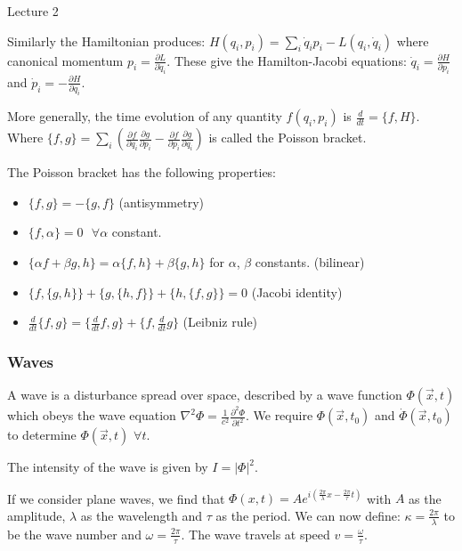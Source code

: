 \begin{center}

Lecture 2

\end{center}

Similarly the Hamiltonian produces: $H(q_i, p_i) = \sum_i \dot{q}_i p _i - L(q_i, \dot{q}_i)$ where canonical momentum $p_i = \frac{\partial L}{\partial \dot{q}_i}$. These give the Hamilton-Jacobi equations: $\dot{q}_i = \frac{\partial H}{\partial p_i}$ and $\dot{p}_i = - \frac{\partial H}{\partial q_i}$.

More generally, the time evolution of any quantity $f(q_i, p_i)$ is $\frac{d}{dt} = \{ f, H \}$. Where $\{f, g\} = \sum_i \left( \frac{\partial f}{\partial q_i} \frac{\partial g}{\partial p_i} - \frac{\partial f}{\partial p_i} \frac{\partial g}{\partial q_i}\right)$ is called the Poisson bracket.

The Poisson bracket has the following properties:

\begin{itemize}
\item $\{ f, g\} = - \{g,f\}$ (antisymmetry)
\item $\{f, \alpha \} = 0 \, \, \, \, \forall \alpha$ constant.
\item $\{ \alpha f + \beta g, h\} = \alpha \{f, h\} + \beta \{g, h\}$ for $\alpha$, $\beta$ constants. (bilinear)
\item $\{f, \{g,h\}\} + \{g, \{h, f\}\} + \{h, \{f,g\}\} = 0$ (Jacobi identity)
\item $\frac{d}{dt} \{f, g\} = \{\frac{d}{dt} f, g\} + \{f, \frac{d}{dt} g\}$ (Leibniz rule)
\end{itemize}

\subsubsection{Waves}

A wave is a disturbance spread over space, described by a wave function $\Phi (\vec{x}, t)$ which obeys the wave equation $\nabla^2 \Phi = \frac{1}{c^2} \frac{\partial^2 \Phi}{\partial t^2}$. We require $\Phi (\vec{x}, t_0)$ and $\dot{\Phi} (\vec{x}, t_0)$ to determine $\Phi (\vec{x}, t)$ $\forall t$.

The intensity of the wave is given by $I = |\Phi|^2$.

If we consider plane waves, we find that $\Phi (x, t) = A e^{i \left(\frac{2\pi}{\lambda} x - \frac{2\pi}{\tau} t\right)}$ with $A$ as the amplitude, $\lambda$ as the wavelength and $\tau$ as the period. We can now define: $\kappa = \frac{2\pi}{\lambda}$ to be the wave number and $\omega = \frac{2\pi}{\tau}$. The wave travels at speed $v = \frac{\omega}{\tau}$.

